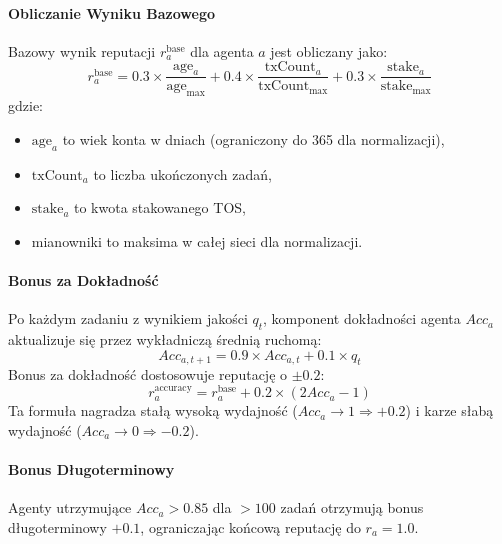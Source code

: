 \documentclass[11pt]{article}
\begin{document}
\paragraph{Obliczanie Wyniku Bazowego} Bazowy wynik reputacji $r_a^{\text{base}}$ dla agenta $a$ jest obliczany jako:
\begin{equation}
r_a^{\text{base}} = 0.3 \times \frac{\text{age}_a}{\text{age}_{\max}} + 0.4 \times \frac{\text{txCount}_a}{\text{txCount}_{\max}} + 0.3 \times \frac{\text{stake}_a}{\text{stake}_{\max}}
\end{equation}
gdzie:
\begin{itemize}[noitemsep]
  \item $\text{age}_a$ to wiek konta w dniach (ograniczony do 365 dla normalizacji),
  \item $\text{txCount}_a$ to liczba ukończonych zadań,
  \item $\text{stake}_a$ to kwota stakowanego TOS,
  \item mianowniki to maksima w całej sieci dla normalizacji.
\end{itemize}

\paragraph{Bonus za Dokładność} Po każdym zadaniu z wynikiem jakości $q_t$, komponent dokładności agenta $Acc_a$ aktualizuje się przez wykładniczą średnią ruchomą:
\begin{equation}
Acc_{a,t+1} = 0.9 \times Acc_{a,t} + 0.1 \times q_t
\end{equation}
Bonus za dokładność dostosowuje reputację o $\pm 0.2$:
\begin{equation}
r_a^{\text{accuracy}} = r_a^{\text{base}} + 0.2 \times (2 Acc_a - 1)
\end{equation}
Ta formuła nagradza stałą wysoką wydajność ($Acc_a \to 1 \Rightarrow +0.2$) i karze słabą wydajność ($Acc_a \to 0 \Rightarrow -0.2$).

\paragraph{Bonus Długoterminowy} Agenty utrzymujące $Acc_a > 0.85$ dla $>100$ zadań otrzymują bonus długoterminowy $+0.1$, ograniczając końcową reputację do $r_a = 1.0$.
\end{document}
